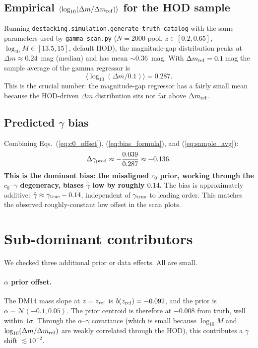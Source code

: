 \documentclass[11pt,a4paper]{article}
\newcommand{\dm}{\Delta m}
\newcommand{\dmref}{\dm_{\rm ref}}
\newcommand{\zref}{z_{\rm ref}}
\begin{document}
\subsection{Empirical $\langle\log_{10}(\dm/\dmref)\rangle$ for the HOD sample}

Running \texttt{destacking.simulation.generate\_truth\_catalog} with the same
parameters used by \texttt{gamma\_scan.py} ($N=2000$ pool, $z \in [0.2,0.65]$,
$\log_{10}M \in [13.5, 15]$, default HOD), the magnitude-gap distribution
peaks at $\dm\approx 0.24$~mag (median) and has mean $\sim 0.36$~mag.  With
$\dmref = 0.1$\,mag the sample average of the gamma regressor is
\begin{equation}
  \bigl\langle\log_{10}(\dm/0.1)\bigr\rangle = 0.287.
  \label{eq:sample_avg}
\end{equation}
This is the crucial number: the magnitude-gap regressor has a fairly small
mean because the HOD-driven $\dm$ distribution sits not far above $\dmref$.

\subsection{Predicted $\gamma$ bias}

Combining Eqs.~(\ref{eq:c0_offset}), (\ref{eq:bias_formula}), and
(\ref{eq:sample_avg}):
\begin{equation}
  \Delta\gamma_{\rm pred} \approx -\frac{0.039}{0.287} \approx -0.136.
  \label{eq:gamma_pred}
\end{equation}
\textbf{This is the dominant bias: the misaligned $c_0$ prior, working through
the $c_0$--$\gamma$ degeneracy, biases $\hat\gamma$ low by roughly $0.14$.}
The bias is approximately additive: $\hat\gamma \approx \gamma_{\rm true}
- 0.14$, independent of $\gamma_{\rm true}$ to leading order.  This matches
the observed roughly-constant low offset in the scan plots.

\section{Sub-dominant contributors}

We checked three additional prior or data effects.  All are small.

\paragraph{$\alpha$ prior offset.}
The DM14 mass slope at $z=\zref$ is $b(\zref) = -0.092$, and the prior is
$\alpha \sim \mathcal{N}(-0.1, 0.05)$.  The prior centroid is therefore at
$-0.008$ from truth, well within $1\sigma$.  Through the $\alpha$--$\gamma$
covariance (which is small because $\log_{10}M$ and $\log_{10}(\dm/\dmref)$ are
weakly correlated through the HOD), this contributes a $\gamma$ shift
$\lesssim 10^{-2}$.
\end{document}
